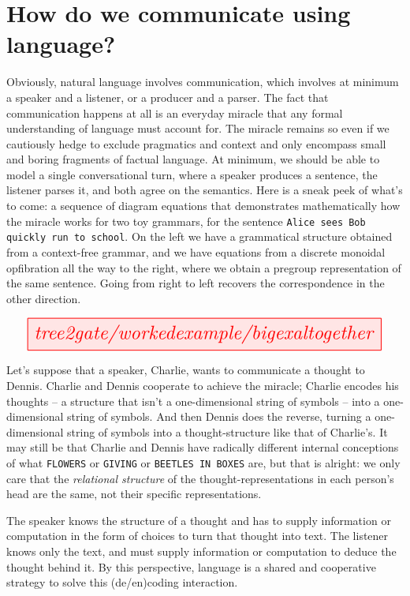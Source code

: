 \section{How do we communicate using language?}\label{sec:miracle}

 Obviously, natural language involves communication, which involves at minimum a speaker and a listener, or a producer and a parser. The fact that communication happens at all is an everyday miracle that any formal understanding of language must account for. The miracle remains so even if we cautiously hedge to exclude pragmatics and context and only encompass small and boring fragments of factual language. At minimum, we should be able to model a single conversational turn, where a speaker produces a sentence, the listener parses it, and both agree on the semantics. Here is a sneak peek of what's to come: a sequence of diagram equations that demonstrates mathematically how the miracle works for two toy grammars, for the sentence \texttt{Alice sees Bob quickly run to school}. On the left we have a grammatical structure obtained from a context-free grammar, and we have equations from a discrete monoidal opfibration all the way to the right, where we obtain a pregroup representation of the same sentence. Going from right to left recovers the correspondence in the other direction.

\[\resizebox{\textwidth}{!}{\tikzfig{tree2gate/workedexample/bigexaltogether}}\]

 Let's suppose that a speaker, Charlie, wants to communicate a thought to Dennis. Charlie and Dennis cooperate to achieve the miracle; Charlie encodes his thoughts -- a structure that isn't a one-dimensional string of symbols -- into a one-dimensional string of symbols. And then Dennis does the reverse, turning a one-dimensional string of symbols into a thought-structure like that of Charlie's. It may still be that Charlie and Dennis have radically different internal conceptions of what \texttt{FLOWERS} or \texttt{GIVING} or \texttt{BEETLES IN BOXES} are, but that is alright: we only care that the \emph{relational structure} of the thought-representations in each person's head are the same, not their specific representations.

 The speaker knows the structure of a thought and has to supply information or computation in the form of choices to turn that thought into text. The listener knows only the text, and must supply information or computation to deduce the thought behind it. By this perspective, language is a shared and cooperative strategy to solve this (de/en)coding interaction.

